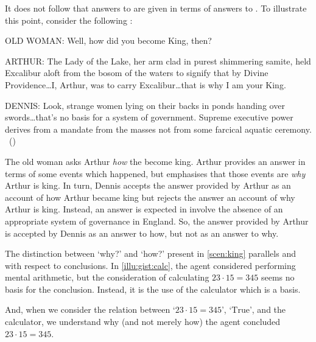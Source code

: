 \begin{note}
  It does not follow that answers to \qWhy{} are given in terms of answers to \qHow{}.
  To illustrate this point, consider the following \scen{}:

  \begin{scenario}[England AD 932]
    \label{scen:king}
    \vspace{-\baselineskip}
    \begin{screenplay}
    \item[OLD WOMAN:]
      Well, how did you become King, then?
    \item[ARTHUR:]
      The Lady of the Lake, her arm clad in purest shimmering samite, held Excalibur aloft from the bosom of the waters to signify that by Divine Providence\space\dots\space I, Arthur, was to carry Excalibur\dots\space that is why I am your King.
    \item[DENNIS:]
      Look, strange women lying on their backs in ponds handing over swords\space\dots\space that's no basis for a system of government.
      Supreme executive power derives from a mandate from the masses not from some farcical aquatic ceremony.\newline
      \mbox{ }\hfill\mbox{(\cite[8--9]{Cleese:1974aa})}
    \end{screenplay}
    \vspace{-\baselineskip}
  \end{scenario}

  The old woman asks Arthur \emph{how} the become king.
  Arthur provides an answer in terms of some events which happened, but emphasises that those events are \emph{why} Arthur is king.
  In turn, Dennis accepts the answer provided by Arthur as an account of how Arthur became king but rejects the answer an account of why Arthur is king.
  Instead, an answer is expected in involve the absence of an appropriate system of governance in England.
  So, the answer provided by Arthur is accepted by Dennis as an answer to how, but not as an answer to why.
\end{note}

\begin{note}
  The distinction between `why?' and `how?' present in \autoref{scen:king} parallels \qWhy{} and \qHow{} with respect to conclusions.
  In \autoref{illu:gist:calc}, the agent considered performing mental arithmetic, but the consideration of calculating \(23 \cdot 15 = 345\) seems no basis for the conclusion.
  Instead, it is the use of the calculator which is a basis.

  And, when we consider the relation between `\(23 \cdot 15 = 345\)', `\(\text{True}\)', and the calculator, we understand why (and not merely how) the agent concluded \(23 \cdot 15 = 345\).
\end{note}

